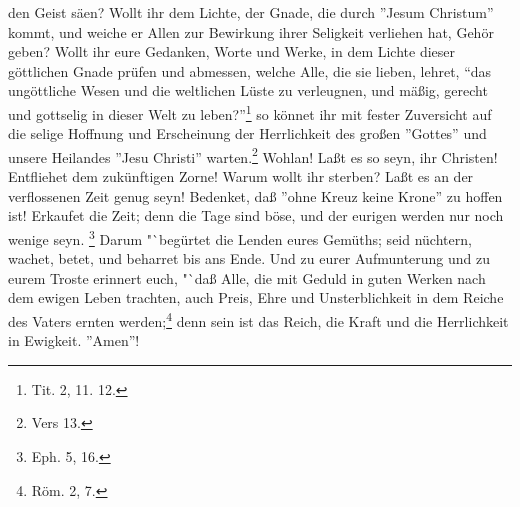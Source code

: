 den Geist säen? Wollt ihr dem Lichte, der Gnade, die durch ''Jesum Christum'' kommt, und weiche er Allen zur Bewirkung ihrer Seligkeit verliehen hat, Gehör geben? Wollt ihr eure Gedanken, Worte und Werke, in dem Lichte dieser göttlichen Gnade prüfen und abmessen, welche Alle, die sie lieben, lehret, "`das ungöttliche Wesen und die weltlichen Lüste zu verleugnen, und mäßig, gerecht und gottselig in dieser Welt zu leben?"'\footnote{Tit. 2, 11. 12.} so könnet ihr mit fester Zuversicht auf die selige Hoffnung und Erscheinung der Herrlichkeit des großen ''Gottes'' und unsere Heilandes ''Jesu Christi'' warten.\footnote{Vers 13.} Wohlan! Laßt es so seyn, ihr Christen! Entfliehet dem zukünftigen Zorne! Warum wollt ihr sterben? Laßt es an der verflossenen Zeit genug seyn! Bedenket, daß ''ohne Kreuz keine Krone'' zu hoffen ist! Erkaufet die Zeit; denn die Tage sind böse, und der eurigen werden nur noch wenige seyn. \footnote{Eph. 5, 16.} Darum "`begürtet die Lenden eures Gemüths; seid nüchtern, wachet, betet, und beharret bis ans Ende. Und zu eurer Aufmunterung und zu eurem Troste erinnert euch, "`daß Alle, die mit Geduld in guten Werken nach dem ewigen Leben trachten, auch Preis, Ehre und Unsterblichkeit in dem Reiche des Vaters ernten werden;\footnote{Röm. 2, 7.} denn sein ist das Reich, die Kraft und die Herrlichkeit in Ewigkeit. ''Amen''!
